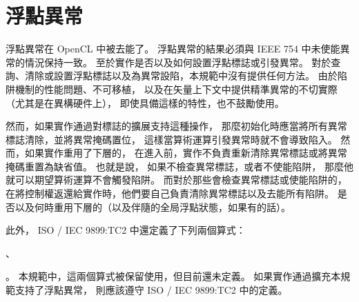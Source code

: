 \section{浮點異常}

浮點異常在 OpenCL 中被去能了。
浮點異常的結果必須與 IEEE 754 中未使能異常的情況保持一致。
至於實作是否以及如何設置浮點標誌或引發異常。
對於查詢、清除或設置浮點標誌以及為異常設陷，本規範中沒有提供任何方法。
由於陷阱機制的性能問題、不可移植，
以及在矢量上下文中提供精準異常的不切實際（尤其是在異構硬件上），
即使具備這樣的特性，也不鼓勵使用。

然而，如果實作通過對標誌的擴展支持這種操作，
那麼初始化時應當將所有異常標誌清除，並將異常掩碼置位，
這樣當算術運算引發異常時就不會導致陷入。
然而，如果實作重用了下層的，
在進入前，實作不負責重新清除異常標誌或將異常掩碼重置為缺省值。
也就是說，
如果不檢查異常標誌，或者不使能陷阱，
那麼他就可以期望算術運算不會觸發陷阱。
而對於那些會檢查異常標誌或使能陷阱的，
在將控制權返還給實作時，他們要自己負責清除異常標誌以及去能所有陷阱。
是否以及何時重用下層的（以及伴隨的全局浮點狀態，如果有的話）。

此外， ISO / IEC 9899:TC2 中還定義了下列兩個算式：
\startigBase
\item {}、
\item {}。
\stopigBase
本規範中，這兩個算式被保留使用，但目前還未定義。
如果實作通過擴充本規範支持了浮點異常，
則應該遵守 ISO / IEC 9899:TC2 中的定義。
